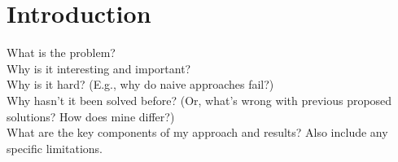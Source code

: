 \section{Introduction}
What is the problem?\\
Why is it interesting and important?\\
Why is it hard? (E.g., why do naive approaches fail?)\\
Why hasn't it been solved before? (Or, what's wrong with previous proposed solutions? How does mine differ?)\\
What are the key components of my approach and results? Also include any specific limitations.\\